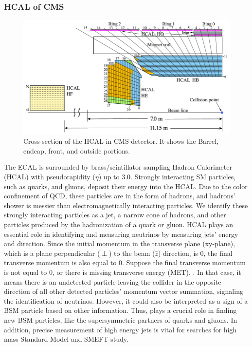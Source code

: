 \subsubsection{HCAL of CMS}
\begin{figure}[h!]
  \label{fig:HCAL}
  \centering
  \includegraphics[width=0.87\linewidth]{figs/HCAL.png}
  \caption{Cross-section of the HCAL in CMS detector. It shows the Barrel, endcap, front, and outside portions. \cite{hcal}}
\end{figure}
The ECAL is surrounded by brass/scintillator sampling Hadron Calorimeter (HCAL) with pseudorapidity ($\eta$) up to 3.0.
Strongly interacting SM particles, such as quarks, and gluons, deposit their energy into the HCAL.
Due to the color confinement of QCD, these particles are in the form of hadrons, and hadrons' shower is messier than electromagnetically interacting particles.
We identify these strongly interacting particles as a jet, a narrow cone of hadrons, and other particles produced by the hadronization of a quark or gluon.
HCAL plays an essential role in identifying and measuring neutrinos by measuring jets' energy and direction.
Since the initial momentum in the transverse plane (xy-plane), which is a plane perpendicular ($\perp$) to the beam ($\hat{z}$) direction, is 0, the final transverse momentum is also equal to 0.
Suppose the final transverse momentum is not equal to 0, or there is missing transverse energy (MET), \MET. In that case, it means there is an undetected particle leaving the collider in the opposite direction of all other detected particles' momentum vector summation, signaling the identification of neutrinos.
However, it could also be interpreted as a sign of a BSM particle based on other information.
Thus, \MET plays a crucial role in finding new BSM particles, like the supersymmetric partners of quarks and gluons.
In addition, precise measurement of high energy jets is vital for searches for high mass Standard Model and SMEFT study.

